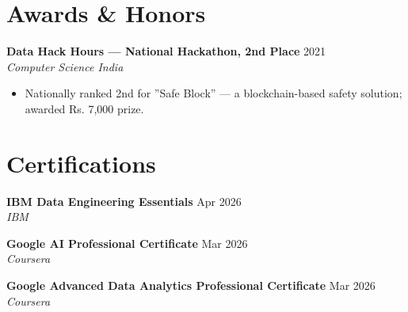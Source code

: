 \documentclass[10pt,letterpaper]{article}
\begin{document}
\section{Awards \& Honors}

\textbf{Data Hack Hours --- National Hackathon, 2nd Place} \hfill 2021 \\
\textit{Computer Science India}
\begin{itemize}
  \item Nationally ranked 2nd for ''Safe Block'' --- a blockchain-based safety solution; awarded Rs. 7,000 prize.
\end{itemize}

\section{Certifications}

\textbf{IBM Data Engineering Essentials} \hfill Apr 2026 \\
\textit{IBM}

\textbf{Google AI Professional Certificate} \hfill Mar 2026 \\
\textit{Coursera}

\textbf{Google Advanced Data Analytics Professional Certificate} \hfill Mar 2026 \\
\textit{Coursera}
\end{document}
